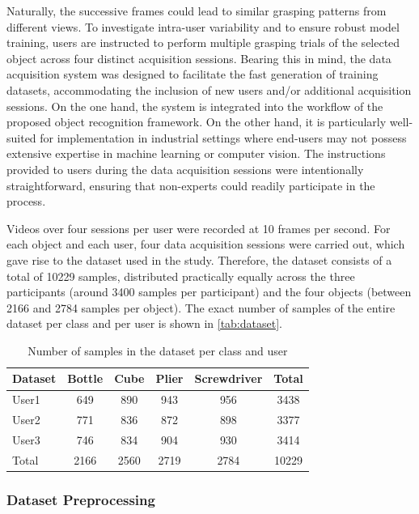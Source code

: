 Naturally, the successive frames could lead to similar grasping patterns from different views. To investigate intra-user variability and to ensure robust model training, users are instructed to perform multiple grasping trials of the selected object across four distinct acquisition sessions. Bearing this in mind, the data acquisition system was designed to facilitate the fast generation of training datasets, accommodating the inclusion of new users and/or additional acquisition sessions. On the one hand, the system is integrated into the workflow of the proposed object recognition framework. On the other hand, it is particularly well-suited for implementation in industrial settings where end-users may not possess extensive expertise in machine learning or computer vision. The instructions provided to users during the data acquisition sessions were intentionally straightforward, ensuring that non-experts could readily participate in the process.

Videos over four sessions per user were recorded at 10 frames per second. For each object and each user, four data acquisition sessions were carried out, which gave rise to the dataset used in the study. Therefore, the dataset consists of a total of \num{10229} samples, distributed practically equally across the three participants (around \num{3400} samples per participant) and the four objects (between \num{2166} and \num{2784} samples per object). The exact number of samples of the entire dataset per class and per user is shown in \autoref{tab:dataset}.

\begin{table}[ht]
\centering
\caption{Number of samples in the dataset per class and user}
\label{tab:dataset}
\begin{tabular}{lccccc}
\toprule
Dataset & Bottle & Cube & Plier & Screwdriver & Total \\
\midrule
User1 & \num{649} & \num{890} & \num{943} & \num{956} & \num{3438}\\
User2 & \num{771} & \num{836} & \num{872} & \num{898} & \num{3377}\\
User3 & \num{746} & \num{834} & \num{904} & \num{930} & \num{3414}\\
\midrule
Total & \num{2166} & \num{2560} & \num{2719} & \num{2784} & \num{10229}\\
\bottomrule
\end{tabular}
\end{table}

\subsubsection{Dataset Preprocessing}

